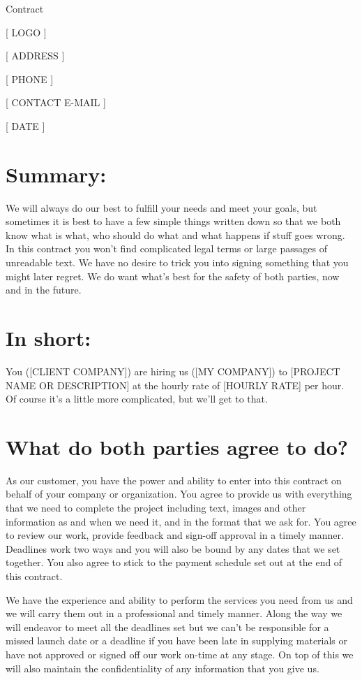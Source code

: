 \documentclass[10pt,a4paper,parskip]{scrartcl}
\begin{document}
\begin{center} {\Large Contract} \end{center}

[ LOGO ]

[ ADDRESS ]

[ PHONE ]

[ CONTACT E-MAIL ]

[ DATE ]

\section{Summary:}

We will always do our best to fulfill your needs and meet your goals, but
sometimes it is best to have a few simple things written down so that we both
know what is what, who should do what and what happens if stuff goes wrong. In
this contract you won't find complicated legal terms or large passages of
unreadable text. We have no desire to trick you into signing something that you
might later regret. We do want what's best for the safety of both parties, now
and in the future.

\section{In short:}

You ([CLIENT COMPANY]) are hiring us ([MY COMPANY]) to [PROJECT NAME OR
DESCRIPTION] at the hourly rate of [HOURLY RATE] per hour. Of course it's a
little more complicated, but we'll get to that.

\section{What do both parties agree to do?}

As our customer, you have the power and ability to enter into this contract on
behalf of your company or organization. You agree to provide us with everything
that we need to complete the project including text, images and other
information as and when we need it, and in the format that we ask for. You
agree to review our work, provide feedback and sign-off approval in a timely
manner. Deadlines work two ways and you will also be bound by any dates that we
set together. You also agree to stick to the payment schedule set out at the
end of this contract.

We have the experience and ability to perform the services you need from us and
we will carry them out in a professional and timely manner. Along the way we
will endeavor to meet all the deadlines set but we can't be responsible for a
missed launch date or a deadline if you have been late in supplying materials
or have not approved or signed off our work on-time at any stage. On top of
this we will also maintain the confidentiality of any information that you give
us.
\end{document}

